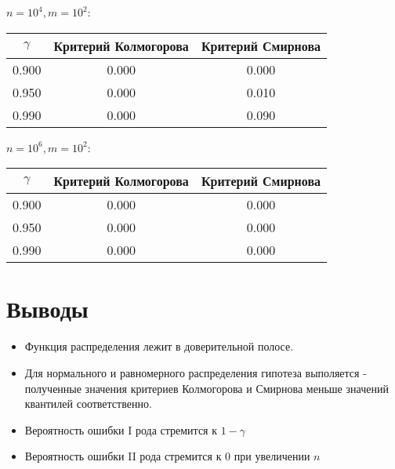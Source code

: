 \documentclass[12pt, a4paper]{article}
\begin{document}
$n = 10^4, m = 10^2$:
\begin{center}
    \begin{tabular}{|c|c|c|}
         \hline \boldmath$\gamma$ & \textbf{Критерий Колмогорова} & \textbf{Критерий Смирнова} \\
         \hline 0.900 & 0.000 & 0.000 \\
         \hline 0.950 & 0.000 & 0.010  \\
         \hline 0.990 & 0.000 & 0.090 \\
         \hline
    \end{tabular}
\end{center}

$n = 10^6, m = 10^2$:

\begin{center}
    \begin{tabular}{|c|c|c|}
         \hline \boldmath$\gamma$ & \textbf{Критерий Колмогорова} & \textbf{Критерий Смирнова} \\
         \hline 0.900 & 0.000 & 0.000 \\
         \hline 0.950 & 0.000 & 0.000  \\
         \hline 0.990 & 0.000 & 0.000 \\
         \hline
    \end{tabular}
\end{center}

\newpage

\section{Выводы}

\begin{itemize}
    \item Функция распределения лежит в доверительной полосе.
    \item  Для нормального и равномерного распределения гипотеза выполяется - полученные     значения критериев Колмогорова и Смирнова меньше значений квантилей соответственно.
    \item  Вероятность ошибки I рода стремится к $1 - \gamma$
    \item  Вероятность ошибки II рода стремится к $0$ при увеличении $n$
\end{itemize}
\end{document}
